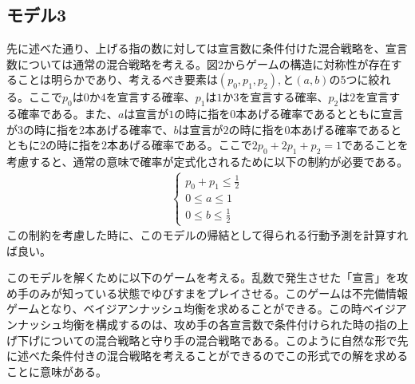 \documentclass{jsarticle}
\begin{document}
\subsection{モデル3}
先に述べた通り、上げる指の数に対しては宣言数に条件付けた混合戦略を、宣言数については通常の混合戦略を考える。図$2$からゲームの構造に対称性が存在することは明らかであり、考えるべき要素は$(p_0,p_1,p_2),$と$(a, b)$の5つに絞れる。ここで$p_0$は$0$か$4$を宣言する確率、$p_1$は$1$か$3$を宣言する確率、$p_2$は$2$を宣言する確率である。また、$a$は宣言が$1$の時に指を$0$本あげる確率であるとともに宣言が$3$の時に指を$2$本あげる確率で、$b$は宣言が$2$の時に指を$0$本あげる確率であるとともに$2$の時に指を$2$本あげる確率である。ここで$2p_0 + 2p_1 + p_2 = 1$であることを考慮すると、通常の意味で確率が定式化されるために以下の制約が必要である。
\begin{align}
\begin{cases} 
p_0 + p_1 \leq \frac{1}{2}\\[7pt]
0 \leq a \leq 1\\[7pt]
0\leq b \leq \frac{1}{2}
\end{cases}
\end{align}
この制約を考慮した時に、このモデルの帰結として得られる行動予測を計算すれば良い。

このモデルを解くために以下のゲームを考える。乱数で発生させた「宣言」を攻め手のみが知っている状態でゆびすまをプレイさせる。このゲームは不完備情報ゲームとなり、ベイジアンナッシュ均衡を求めることができる。この時ベイジアンナッシュ均衡を構成するのは、攻め手の各宣言数で条件付けられた時の指の上げ下げについての混合戦略と守り手の混合戦略である。このように自然な形で先に述べた条件付きの混合戦略を考えることができるのでこの形式での解を求めることに意味がある。
\end{document}
